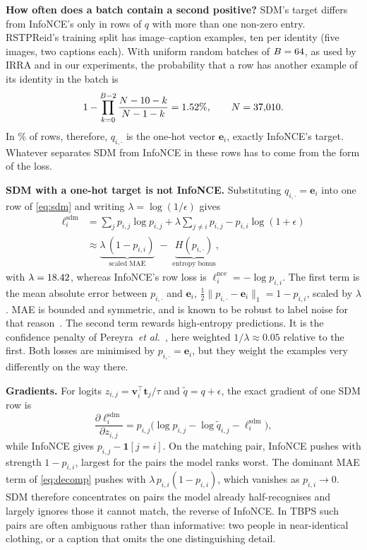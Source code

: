 \textbf{How often does a batch contain a second positive?} SDM's target differs from InfoNCE's only in rows of $q$ with more than one non-zero entry. RSTPReid's training split has \nExamples{} image--caption examples, ten per identity (five images, two captions each). With uniform random batches of $B=64$, as used by IRRA and in our experiments, the probability that a row has another example of its identity in the batch is
\begin{equation}
1-\prod_{k=0}^{B-2}\frac{N-10-k}{N-1-k}=1.52\%,\qquad N=37{,}010.\label{eq:posfrac}
\end{equation}
In \oneHotFrac\% of rows, therefore, $q_{i,\cdot}$ is the one-hot vector $\mathbf{e}_i$, exactly InfoNCE's target. Whatever separates SDM from InfoNCE in these rows has to come from the form of the loss.

\textbf{SDM with a one-hot target is not InfoNCE.} Substituting $q_{i,\cdot}=\mathbf{e}_i$ into one row of \cref{eq:sdm} and writing $\lambda=\log(1/\epsilon)$ gives
\begin{align}
\ell^{\mathrm{sdm}}_i&=\sum_{j}p_{i,j}\log p_{i,j}+\lambda\sum_{j\neq i}p_{i,j}-p_{i,i}\log(1+\epsilon)\nonumber\\
&\approx \underbrace{\lambda\,(1-p_{i,i})}_{\text{scaled MAE}}\;-\;\underbrace{H(p_{i,\cdot})}_{\text{entropy bonus}},\label{eq:decomp}
\end{align}
with $\lambda=18.42$, whereas InfoNCE's row loss is $\ell^{\mathrm{nce}}_i=-\log p_{i,i}$. The first term is the mean absolute error between $p_{i,\cdot}$ and $\mathbf{e}_i$, $\tfrac12\lVert p_{i,\cdot}-\mathbf{e}_i\rVert_1=1-p_{i,i}$, scaled by $\lambda$. MAE is bounded and symmetric, and is known to be robust to label noise for that reason~\cite{ghosh2017robustlossfunctionslabel}. The second term rewards high-entropy predictions. It is the confidence penalty of Pereyra~\textit{et al.}~\cite{pereyra2017regularizingneuralnetworkspenalizing}, here weighted $1/\lambda\approx0.05$ relative to the first. Both losses are minimised by $p_{i,\cdot}=\mathbf{e}_i$, but they weight the examples very differently on the way there.

\textbf{Gradients.} For logits $z_{i,j}=\mathbf{v}_i^{\top}\mathbf{t}_j/\tau$ and $\tilde q=q+\epsilon$, the exact gradient of one SDM row is
\begin{equation}
\frac{\partial\ell^{\mathrm{sdm}}_i}{\partial z_{i,j}}=p_{i,j}\big(\log p_{i,j}-\log\tilde q_{i,j}-\ell^{\mathrm{sdm}}_i\big),\label{eq:grad}
\end{equation}
while InfoNCE gives $p_{i,j}-\mathbf{1}[j=i]$. On the matching pair, InfoNCE pushes with strength $1-p_{i,i}$, largest for the pairs the model ranks worst. The dominant MAE term of \cref{eq:decomp} pushes with $\lambda\,p_{i,i}(1-p_{i,i})$, which vanishes as $p_{i,i}\to0$. SDM therefore concentrates on pairs the model already half-recognises and largely ignores those it cannot match, the reverse of InfoNCE. In TBPS such pairs are often ambiguous rather than informative: two people in near-identical clothing, or a caption that omits the one distinguishing detail.

